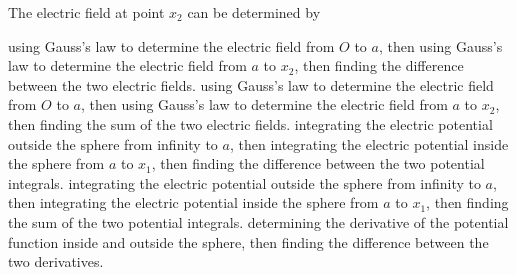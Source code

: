 \documentclass{../../oss-classkick-exam}
\begin{document}
\begin{multicols*}{2}
\begin{questions}

    \question The electric field at point $x_2$ can be determined by
    \begin{choices}
      \choice using Gauss's law to determine the electric field from $O$ to $a$,
      then using Gauss's law to determine the electric field from $a$ to $x_2$,
      then finding the difference between the two electric fields.
      \choice using Gauss's law to determine the electric field from $O$ to $a$,
      then using Gauss's law to determine the electric field from $a$ to $x_2$,
      then finding the sum of the two electric fields.
      \choice integrating the electric potential outside the sphere from
      infinity to $a$, then integrating the electric potential inside the
      sphere from $a$ to $x_1$, then finding the difference between the two
      potential integrals.
      \choice integrating the electric potential outside the sphere from
      infinity to $a$, then integrating the electric potential inside the
      sphere from $a$ to $x_1$, then finding the sum of the two potential
      integrals.
      \choice determining the derivative of the potential function inside and
      outside the sphere, then finding the difference between the two
      derivatives.
    \end{choices}
    \label{sphere1}
    

\end{questions}
\end{multicols*}
\end{document}

